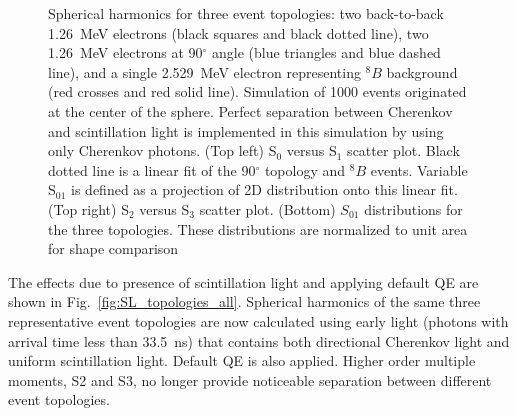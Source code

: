 \documentclass[12pt,twoside,letterpaper]{article}
\newcommand{\B}{^{8}B}
\begin{document}
\begin{figure}[htb]
\caption{Spherical harmonics for three event topologies: two back-to-back 1.26~MeV electrons (black squares and black dotted line), two 1.26~MeV electrons at 90$^{\circ}$ angle (blue triangles and blue dashed line), and a single 2.529~MeV electron representing $\B$ background (red crosses and red solid line). Simulation of 1000 events originated at the center of the sphere. Perfect separation between Cherenkov and scintillation light is implemented in this simulation by using only Cherenkov photons. (Top left) S$_0$ versus S$_1$ scatter plot. Black dotted line is a linear fit of the 90$^{\circ}$ topology and $\B$ events. Variable S$_{01}$ is defined as a projection of 2D distribution onto this linear fit. (Top right) S$_2$ versus S$_3$ scatter plot. (Bottom) $S_{01}$ distributions for the three topologies. These distributions are normalized to unit area for shape comparison}
\label{fig:SL_topologies_CHE}
\end{figure}


The effects due to presence of scintillation light and applying default QE are shown in Fig.~\ref{fig:SL_topologies_all}. Spherical harmonics of the same three representative event topologies are now calculated using early light (photons with arrival time less than 33.5~ns) that contains both directional Cherenkov light and uniform scintillation light. Default QE is also applied. Higher order multiple moments, S2 and S3, no longer provide noticeable separation between different event topologies.
\end{document}
